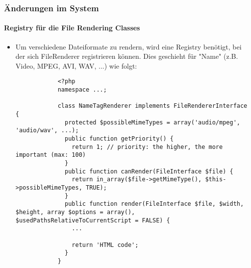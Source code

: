 
\begin{frame}[fragile]
	\frametitle{Änderungen im System}
	\framesubtitle{Registry für die File Rendering Classes}

	\lstset{
		basicstyle=\tiny\ttfamily
	}

	\begin{itemize}
		\item Um verschiedene Dateiformate zu rendern, wird eine Registry benötigt,
			bei der sich FileRenderer registrieren können. Dies geschieht für "Name"
			(z.B. Video, MPEG, AVI, WAV, ...) wie folgt:

		\begin{lstlisting}
			<?php
			namespace ...;

			class NameTagRenderer implements FileRendererInterface {
			  protected $possibleMimeTypes = array('audio/mpeg', 'audio/wav', ...);
			  public function getPriority() {
			    return 1; // priority: the higher, the more important (max: 100)
			  }
			  public function canRender(FileInterface $file) {
			    return in_array($file->getMimeType(), $this->possibleMimeTypes, TRUE);
			  }
			  public function render(FileInterface $file, $width, $height, array $options = array(), $usedPathsRelativeToCurrentScript = FALSE) {
			    ...

			    return 'HTML code';
			  }
			}
		\end{lstlisting}

	\end{itemize}

\end{frame}


